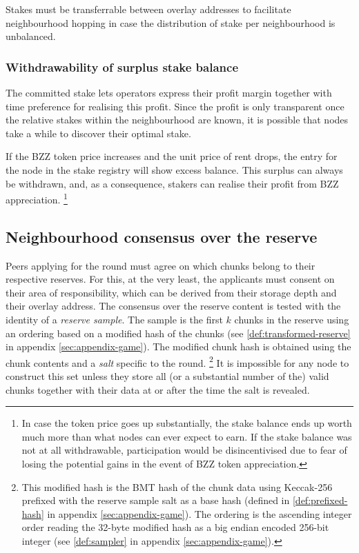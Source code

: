 Stakes must be transferrable between overlay addresses to facilitate neighbourhood hopping in case the distribution of stake per neighbourhood is unbalanced. 

\subsubsection{Withdrawability of surplus stake balance}



The committed stake lets operators express their  profit margin together with time preference for realising this profit. Since the profit is only transparent once the relative stakes within the neighbourhood are known, it is possible that nodes take a while to discover their optimal stake. 

If the BZZ token price increases and the unit price of rent drops, the entry for the node in the stake registry will show excess balance. This surplus can always be withdrawn,
and, as a consequence, stakers can realise their profit from BZZ appreciation.%
%
\footnote{In case the token price goes up substantially, the stake balance ends up worth much more than what nodes can ever expect to earn. If the stake balance was not at all withdrawable, participation would be disincentivised due to fear of losing the potential gains in the event of BZZ token appreciation.}
% 

 
\subsection{Neighbourhood consensus over the reserve}\label{sec:por}

Peers applying for the round must agree on which chunks belong to their respective reserves. For this, at the very least, the applicants must consent on their area of responsibility, which can be derived from their storage depth and their overlay address.  
The consensus over the reserve content is tested with the identity of a \emph{reserve sample}.
The sample is the first $k$ chunks in the reserve using an ordering based on a modified hash of the chunks (see \ref{def:transformed-reserve} in appendix \ref{sec:appendix-game}).  The modified chunk hash is  obtained using the chunk contents and a \emph{salt} specific to the round.%
%
\footnote{This modified hash is the BMT hash of the chunk data using Keccak-256 prefixed with the reserve sample salt as a base hash (defined in \ref{def:prefixed-hash} in appendix \ref{sec:appendix-game}). The ordering is the ascending integer order reading the 32-byte modified hash as a big endian encoded 256-bit integer (see \ref{def:sampler} in appendix \ref{sec:appendix-game}).}
%
It is impossible for any node to construct this set unless they store all (or a substantial number of the) valid chunks together with their data at or after the time the salt is revealed. 


